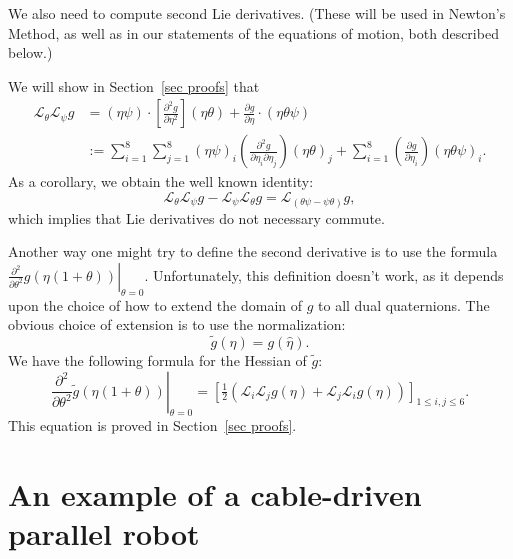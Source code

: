 \documentclass[reqno,12pt]{amsart}
\newcommand{\liederiv}{\mathcal L}
\begin{document}
We also need to compute second Lie derivatives.  (These will be used in Newton's Method, as well as in our statements of the equations of motion, both described below.)

We will show in Section~\ref{sec proofs} that
\begin{equation}
\label{second lie deriv}
\begin{aligned}
\liederiv_\theta \liederiv_\psi g &= (\eta \psi) \cdot \left[\frac{\partial^2 g}{\partial \eta^2}\right](\eta \theta) + \frac{\partial g}{\partial \eta} \cdot (\eta \theta \psi) \\
&:= \sum_{i=1}^8 \sum_{j=1}^8 (\eta \psi)_i \left(\frac{\partial^2 g}{\partial \eta_i \partial \eta_j}\right)(\eta \theta)_j + \sum_{i=1}^8 \left(\frac{\partial g}{\partial \eta_i}\right) (\eta \theta \psi)_i .
\end{aligned}
\end{equation}
As a corollary, we obtain the well known identity:
\begin{equation}
\label{lie bracket diff = diff lie bracket}
\liederiv_\theta \liederiv_\psi g - \liederiv_\psi \liederiv_\theta g = \liederiv_{(\theta\psi - \psi\theta)} g,
\end{equation}
which implies that Lie derivatives do not necessary commute.

Another way one might try to define the second derivative is to use the formula $\left.\frac {\partial^2}{\partial\theta^2} g(\eta(1+\theta)) \right | _{\theta=0}$.  Unfortunately, this definition doesn't work, as it depends upon the choice of how to extend the domain of $g$ to all dual quaternions.  The obvious choice of extension is to use the normalization:
\begin{equation}
\tilde g(\eta) = g(\hat\eta) .
\end{equation}
We have the following formula for the Hessian of $\tilde g$:
\begin{equation}
\label{hessian}
\left.\frac{\partial^2}{\partial\theta^2} \tilde g(\eta(1+\theta)) \right|_{\theta = 0} = \left[\tfrac12 (\liederiv_i \liederiv_j g(\eta) + \liederiv_j \liederiv_i g(\eta)) \right]_{1\le i,j\le 6}.
\end{equation}
This equation is proved in Section~\ref{sec proofs}.

\section{An example of a cable-driven parallel robot}
\end{document}
